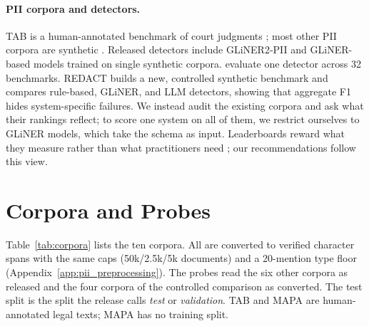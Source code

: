 \documentclass[11pt]{article}
\begin{document}
\paragraph{PII corpora and detectors.}
TAB is a human-annotated benchmark of court judgments
\cite{pilan2022tab}; most other PII corpora are synthetic
\cite{ai4privacy_open_pii_masking_500k,nemotron-pii,
savkin-etal-2025-spy}. Released detectors include GLiNER2-PII
\cite{zaratiana2026gliner2pii} and GLiNER-based models trained on single
synthetic corpora. \citet{uppala2026opf} evaluate one detector across 32
benchmarks. REDACT \cite{vats2026redact} builds a new, controlled
synthetic benchmark and compares rule-based, GLiNER, and LLM detectors,
showing that aggregate F1 hides system-specific failures. We instead
audit the existing corpora and ask what their rankings reflect; to score
one system on all of them, we restrict ourselves to GLiNER models,
which take the schema as input.
Leaderboards reward what they measure rather than what practitioners
need \cite{ethayarajh-jurafsky-2020-utility}; our recommendations follow
this view.

\section{Corpora and Probes}
\label{sec:corpora}

\begin{table}[t]
\centering
\small
\setlength{\tabcolsep}{2.6pt}
\caption{Audited corpora (documents per split). $^\dagger$: used to
compare training objectives (Section~\ref{sec:case}).}
\label{tab:corpora}
\end{table}

Table~\ref{tab:corpora} lists the ten corpora. All are converted to
verified character spans with the same caps (50k/2.5k/5k documents) and
a 20-mention type floor (Appendix~\ref{app:pii_preprocessing}). The
probes read the six other corpora as released and the four corpora of
the controlled comparison as converted. The test split is
the split the release calls \emph{test} or \emph{validation}. TAB and
MAPA are human-annotated legal texts; MAPA has no training split.
\end{document}
